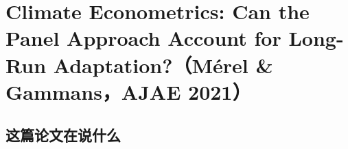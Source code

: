 
\chapter{Climate Econometrics: Can the Panel Approach Account for Long-Run Adaptation?（Mérel \& Gammans，AJAE 2021）}
\label{ch:merel-gammans-2021}

\section{这篇论文在说什么}

